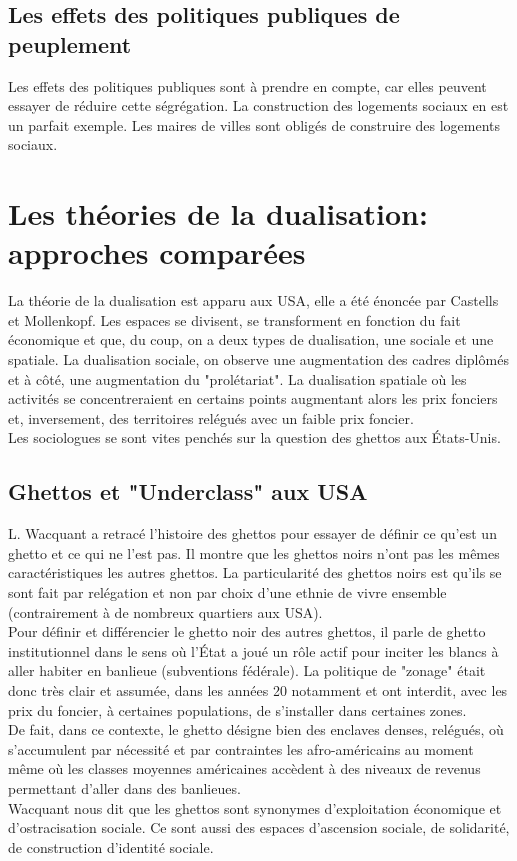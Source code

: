 \documentclass[10pt, a4paper, openany]{book}
\begin{document}
\subsection{Les effets des politiques publiques de peuplement}

Les effets des politiques publiques sont à prendre en compte, car elles peuvent essayer de réduire cette ségrégation. La construction des logements sociaux en est un parfait exemple. Les maires de villes sont obligés de construire des logements sociaux.


\section{Les théories de la dualisation: approches comparées}

La théorie de la dualisation est apparu aux USA, elle a été énoncée par Castells et Mollenkopf. Les espaces se divisent, se transforment en fonction du fait économique et que, du coup, on a deux types de dualisation, une sociale et une spatiale. La dualisation sociale, on observe une augmentation des cadres diplômés et à côté, une augmentation du "prolétariat". La dualisation spatiale où les activités se concentreraient en certains points augmentant alors les prix fonciers et, inversement, des territoires relégués avec un faible prix foncier. \\
Les sociologues se sont vites penchés sur la question des ghettos aux États-Unis.

\subsection{Ghettos et "Underclass" aux USA}

L. Wacquant a retracé l'histoire des ghettos pour essayer de définir ce qu'est un ghetto et ce qui ne l'est pas. Il montre que les ghettos noirs n'ont pas les mêmes caractéristiques les autres ghettos. La particularité des ghettos noirs est qu'ils se sont fait par relégation et non par choix d'une ethnie de vivre ensemble (contrairement à de nombreux quartiers aux USA). \\
Pour définir et différencier le ghetto noir des autres ghettos, il parle de ghetto institutionnel dans le sens où l'État a joué un rôle actif pour inciter les blancs à aller habiter en banlieue (subventions fédérale). La politique de "zonage" était donc très clair et assumée, dans les années 20 notamment et ont interdit, avec les prix du foncier, à certaines populations, de s'installer dans certaines zones. \\
De fait, dans ce contexte, le ghetto désigne bien des enclaves denses, relégués, où s'accumulent par nécessité et par contraintes les afro-américains au moment même où les classes moyennes américaines accèdent à des niveaux de revenus permettant d'aller dans des banlieues. \\
Wacquant nous dit que les ghettos sont synonymes d'exploitation économique et d'ostracisation sociale. Ce sont aussi des espaces d'ascension sociale, de solidarité, de construction d'identité sociale.
\end{document}
